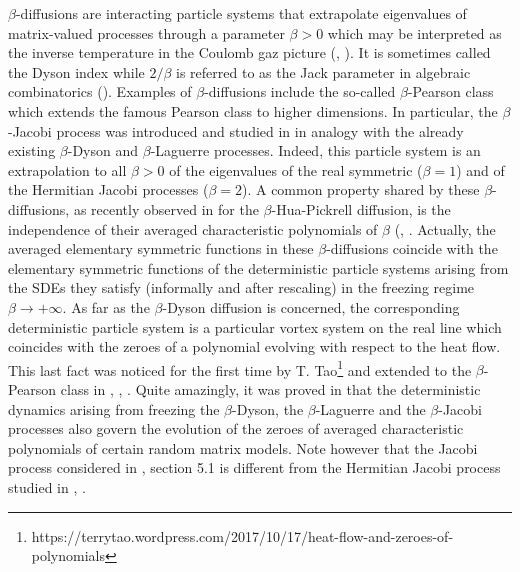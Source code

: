 \documentclass[12pt,reqno]{amsart}
\begin{document}
$\beta$-diffusions are interacting particle systems that extrapolate eigenvalues of matrix-valued processes through a parameter $\beta > 0$ which may be interpreted as the inverse temperature in the Coulomb gaz picture (\cite{assiotis2023exact}, \cite{For}). It is sometimes called the Dyson index while $2/\beta$ is referred to as the Jack parameter in algebraic combinatorics (\cite{For}). Examples of $\beta$-diffusions include the so-called $\beta$-Pearson class which extends the famous Pearson class to higher dimensions. 
In particular, the $\beta$-Jacobi process was introduced and studied in \cite{MR2719370} in analogy with the already existing $\beta$-Dyson and $\beta$-Laguerre processes. 
Indeed, this particle system is an extrapolation to all $\beta > 0$ of the eigenvalues of the real symmetric ($\beta = 1$) and of the Hermitian Jacobi processes ($\beta=2$). 
A common property shared by these $\beta$-diffusions, as recently observed in \cite{auer2026hua} for the $\beta$-Hua-Pickrell diffusion, is the independence of their averaged characteristic polynomials of $\beta$ (\cite{MR4673381}, \cite{MR4781073}. Actually, the averaged elementary symmetric functions in these $\beta$-diffusions coincide with the elementary symmetric functions of the deterministic particle systems arising from the SDEs they satisfy
(informally and after rescaling) in the freezing regime $\beta \rightarrow +\infty$. As far as the $\beta$-Dyson diffusion is concerned, the corresponding deterministic particle system is a particular vortex system on the real line which coincides with the zeroes of a polynomial evolving with respect to the heat 
flow. This last fact was noticed for the first time by T. Tao\footnote{https://terrytao.wordpress.com/2017/10/17/heat-flow-and-zeroes-of-polynomials} and extended to the $\beta$-Pearson class 
in \cite{MR4673381}, \cite{MR4781073}, \cite{auer2026hua}. Quite amazingly, it was proved in \cite{FFPP} that the deterministic dynamics arising from freezing the $\beta$-Dyson, the $\beta$-Laguerre and the $\beta$-Jacobi processes also govern the evolution of the zeroes of averaged characteristic polynomials of certain random matrix models. 
Note however that the Jacobi process considered in \cite{FFPP}, section 5.1 is different from the Hermitian Jacobi process studied in \cite{MR3842169}, \cite{MR4173022}. 
\end{document}
